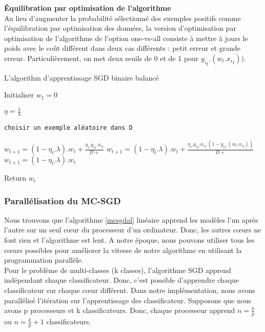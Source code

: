 \textbf{Équilibration par optimisation de l'algorithme}\\

Au lieu d'augmenter la probabilité sélectionné des exemples positifs comme l'équilibration par optimisation des données, la version d'optimisation par optimisation de l'algorithme de l'option one-vs-all consiste à mettre à jours le poids avec le coût différent dans deux cas différents : petit erreur et grande erreur. Particulièrement, on met deux seuils de 0 et de 1 pour ${y_i}_t.(w_t.{x_i}_t))$.

\begin{algorithm}[H]
\caption{L'algorithm d'apprentissage SGD binaire balancé}\label{balance-sgdal}
\begin{algorithmic}[1]

\State Initialiser $w_1 = 0$


\State $\eta = \frac{1}{\lambda}$

\State \texttt{choisir un exemple aléatoire dans D}

\State $w_{t+1} = (1 - \eta_t.\lambda).w_t + \frac{\eta_t.{y_i}_t.{x_i}_t}{D+}$
\State $w_{t+1} = (1 - \eta_t.\lambda).w_t + \frac{\eta_t.{y_i}_t.{x_i}_t.(1 - {y_i}_t.(w_t.{x_i}_t))}{D+}$
\Else
\State $w_{t+1} = (1 - \eta_t.\lambda).w_t$
\EndIf
\EndFor

\EndFor

\State Return $w_{t}$

\EndProcedure
\end{algorithmic}
\end{algorithm}


\subsubsection{Parallélisation du MC-SGD}
Nous trouvons que l'algorithme \ref{mcsgdal} linéaire apprend les modèles l'un après l'autre sur un seul cœur du processeur d'un ordinateur. Donc, les autres cœurs ne font rien et l'algorithme est lent. A notre époque, nous pouvons utiliser tous les cœurs possibles pour améliorer la vitesse de notre algorithme en utilisant la programmation parallèle.\\

Pour le problème de multi-classes (k classes), l'algorithme SGD apprend indépendant chaque classificateur. Donc, c'est possible d'apprendre chaque classificateur sur chaque cœur différent. Dans notre implémentation, nous avons parallélisé l'itération sur l'apprentissage des classificateur. Supposons que nous avons p processeurs et k classificateurs. Donc, chaque processeur apprend $n = \frac{k}{p}$ ou $n = \frac{k}{p} + 1$ classificateurs.

